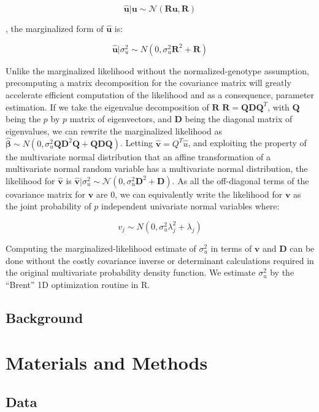 $$\hat{\textbf{u}} | \textbf{u} \sim \mathcal{N}(\textbf{R} \textbf{u},\textbf{R})$$

, the marginalized form of $\hat{\textbf{u}}$ is:

\[ \hat{\textbf{u}}|\sigma_u^2 \sim N(0,\sigma_u^2\textbf{R}^2+\textbf{R})\]

Unlike the marginalized likelihood without the normalized-genotype assumption,
precomputing a matrix decomposition for the covariance matrix will greatly
accelerate efficient computation of the likelihood
and as a consequence, parameter estimation.
If we take the eigenvalue decomposition of $\textbf{R}$ $\textbf{R}=\textbf{Q}\textbf{D}\textbf{Q}^T$, with $\textbf{Q}$ 
being the $p$ by $p$ matrix of
eigenvectors, and $\textbf{D}$ being the diagonal matrix of eigenvalues, we can rewrite the marginalized likelihood as
$\hat{\boldsymbol{\beta}} \sim N(0,\sigma_u^2\textbf{QD}^2\textbf{Q}+\textbf{QDQ})$.  Letting
$\hat{\textbf{v}} = Q^{T}\hat{u}$, and exploiting the property of
the multivariate normal distribution that an affine transformation of a multivariate normal random variable has a multivariate normal distribution, the
likelihood for $\hat{\textbf{v}}$ is $\hat{\textbf{v}}|\sigma_u^2 \sim \mathcal{N}(0,\sigma_u^2\textbf{D}^{2}+\textbf{D})$.  As all the off-diagonal terms of
the covariance matrix for ${\textbf{v}}$ are $0$, we can equivalently write the likelihood for ${\textbf{v}}$ as the joint probability of $p$ independent
univariate normal variables where:

\[ v_j \sim N(0,\sigma^2_u\lambda_j^2+\lambda_j) \]

Computing the marginalized-likelihood estimate of $\sigma^2_u$ in terms of $\textbf{v}$ and $\textbf{D}$ can be done without the costly covariance inverse or determinant calculations required in the original multivariate probability density function.  We estimate $\sigma^2_u$ by the ``Brent'' 1D optimization routine in R\cite{brent1972algorithms}. 



\subsection{Background}\label{sec:org13cff0e}

\section{Materials and Methods}\label{sec:org762fc74}

\subsection{Data}\label{sec:org079c51d}



